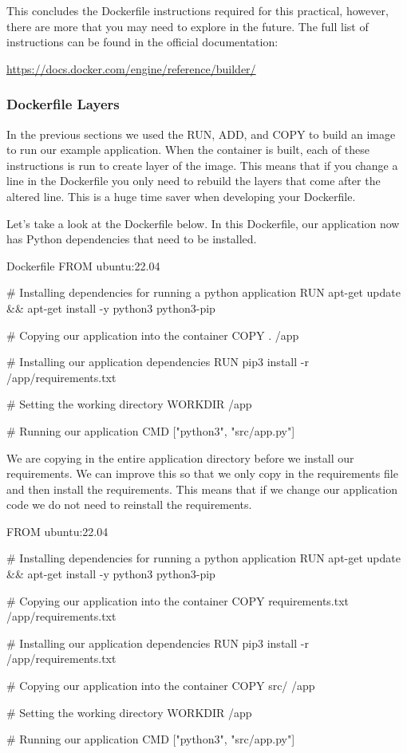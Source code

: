 \documentclass{csse4400}
\begin{document}
This concludes the Dockerfile instructions required for this practical,
however, there are more that you may need to explore in the future.
The full list of instructions can be found in the official documentation:

\url{https://docs.docker.com/engine/reference/builder/}

\subsubsection{Dockerfile Layers}

In the previous sections we used the RUN, ADD, and COPY to build an image to run our example application.
When the container is built, each of these instructions is run to create layer of the image.
This means that if you change a line in the Dockerfile you only need to rebuild the layers that come after the altered line.
This is a huge time saver when developing your Dockerfile.

Let's take a look at the Dockerfile below.
In this Dockerfile, our application now has Python dependencies that need to be installed.

\begin{code}[language=docker,numbers=none]{Dockerfile}
FROM ubuntu:22.04

# Installing dependencies for running a python application
RUN apt-get update && apt-get install -y python3 python3-pip

# Copying our application into the container
COPY . /app

# Installing our application dependencies
RUN pip3 install -r /app/requirements.txt

# Setting the working directory
WORKDIR /app

# Running our application
CMD ["python3", "src/app.py"]
\end{code}

We are copying in the entire application directory before we install our requirements.
We can improve this so that we only copy in the requirements file and then install the requirements.
This means that if we change our application code we do not need to reinstall the requirements.

\begin{code}[language=docker,numbers=none]{}
FROM ubuntu:22.04

# Installing dependencies for running a python application
RUN apt-get update && apt-get install -y python3 python3-pip

# Copying our application into the container
COPY requirements.txt /app/requirements.txt

# Installing our application dependencies
RUN pip3 install -r /app/requirements.txt

# Copying our application into the container
COPY src/ /app

# Setting the working directory
WORKDIR /app

# Running our application
CMD ["python3", "src/app.py"]
\end{code}
\end{document}
